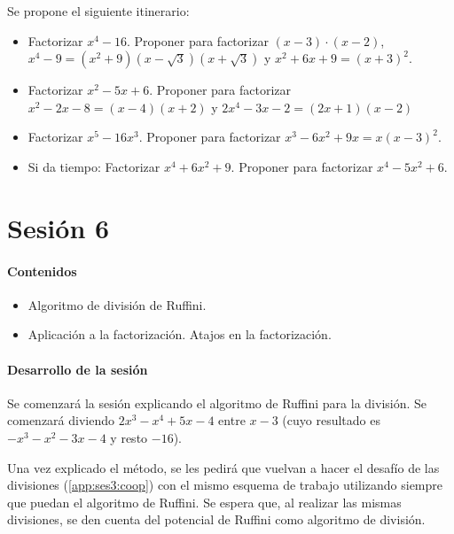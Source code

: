Se propone el siguiente itinerario:

\begin{itemize}
	\item Factorizar $x^4-16$. Proponer para factorizar $(x-3)·(x-2)$,$x^4-9 = (x^2+9)(x-\sqrt{3})(x+\sqrt{3})$ y $x^2+6x+9 = (x+3)^2$.
	
	\item Factorizar $x^2-5x+6$. Proponer para factorizar $x^2-2x-8 = (x-4)(x+2)$ y $2x^4-3x-2 = (2x+1)(x-2)$
	\item Factorizar $x^5-16x^3$. Proponer para factorizar $x^3-6x^2+9x = x(x-3)^2$.
	\item Si da tiempo: Factorizar $x^4+6x^2+9$. Proponer para factorizar $x^4-5x^2+6$.
\end{itemize}





\section{Sesión 6}

\paragraph{Contenidos}
\begin{itemize}
	\item Algoritmo de división de Ruffini.
	\item Aplicación a la factorización.
	\subitem Atajos en la factorización.
\end{itemize}

\paragraph{Desarrollo de la sesión}

Se comenzará la sesión explicando el algoritmo de Ruffini para la división. 
%
Se comenzará diviendo $2x^3-x^4+5x-4$ entre $x-3$ (cuyo resultado es $-x^3-x^2-3x-4$ y resto $-16$).

Una vez explicado el método, se les pedirá que vuelvan a hacer el desafío de las divisiones (\ref{app:ses3:coop}) con el mismo esquema de trabajo utilizando siempre que puedan el algoritmo de Ruffini.
%
Se espera que, al realizar las mismas divisiones, se den cuenta del potencial de Ruffini como algoritmo de división.

